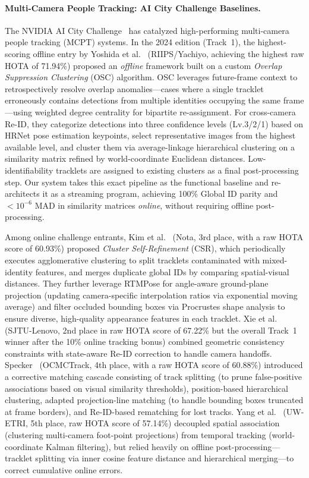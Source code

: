 \documentclass[11pt]{article}
\begin{document}
\paragraph{Multi-Camera People Tracking: AI City Challenge Baselines.}
The NVIDIA AI City Challenge~\cite{wang2024aicity} has catalyzed high-performing multi-camera people tracking (MCPT) systems. In the 2024 edition (Track~1), the highest-scoring offline entry by Yoshida et al.~\cite{yoshida2024overlap} (RIIPS/Yachiyo, achieving the highest raw HOTA of 71.94\%) proposed an \emph{offline} framework built on a custom \emph{Overlap Suppression Clustering} (OSC) algorithm. OSC leverages future-frame context to retrospectively resolve overlap anomalies---cases where a single tracklet erroneously contains detections from multiple identities occupying the same frame---using weighted degree centrality for bipartite re-assignment. For cross-camera Re-ID, they categorize detections into three confidence levels (Lv.3/2/1) based on HRNet pose estimation keypoints, select representative images from the highest available level, and cluster them via average-linkage hierarchical clustering on a similarity matrix refined by world-coordinate Euclidean distances. Low-identifiability tracklets are assigned to existing clusters as a final post-processing step. Our system takes this exact pipeline as the functional baseline and re-architects it as a streaming program, achieving 100\% Global ID parity and $<10^{-6}$ MAD in similarity matrices \emph{online}, without requiring offline post-processing.

Among online challenge entrants, Kim et al.~\cite{kim2024cluster} (Nota, 3rd place, with a raw HOTA score of 60.93\%) proposed \emph{Cluster Self-Refinement} (CSR), which periodically executes agglomerative clustering to split tracklets contaminated with mixed-identity features, and merges duplicate global IDs by comparing spatial-visual distances. They further leverage RTMPose for angle-aware ground-plane projection (updating camera-specific interpolation ratios via exponential moving average) and filter occluded bounding boxes via Procrustes shape analysis to ensure diverse, high-quality appearance features in each tracklet. Xie et al.~\cite{xie2024robust} (SJTU-Lenovo, 2nd place in raw HOTA score of 67.22\% but the overall Track~1 winner after the 10\% online tracking bonus) combined geometric consistency constraints with state-aware Re-ID correction to handle camera handoffs. Specker~\cite{specker2024ocmctrack} (OCMCTrack, 4th place, with a raw HOTA score of 60.88\%) introduced a corrective matching cascade consisting of track splitting (to prune false-positive associations based on visual similarity thresholds), position-based hierarchical clustering, adapted projection-line matching (to handle bounding boxes truncated at frame borders), and Re-ID-based rematching for lost tracks. Yang et al.~\cite{yang2024online} (UW-ETRI, 5th place, raw HOTA score of 57.14\%) decoupled spatial association (clustering multi-camera foot-point projections) from temporal tracking (world-coordinate Kalman filtering), but relied heavily on offline post-processing---tracklet splitting via inner cosine feature distance and hierarchical merging---to correct cumulative online errors.
\end{document}
